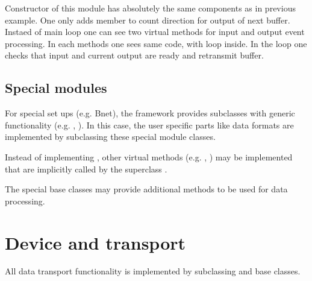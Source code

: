 Constructor of this module has absolutely the same components as in previous example.
One only adds  member to count direction for output of next buffer. 
Instaed of main loop one can see two virtual methods for input and output event
processing. In each methods one sees same code, with  loop inside.
In the loop one checks that input and current output are ready and retransmit buffer.
 
    
   

\subsection{Special modules}
For special set ups (e.g. Bnet), the framework provides 
    subclasses with generic functionality 
   (e.g. , ). 
   In this case, the user specific parts like data formats are 
   implemented by subclassing these special module classes.

   
\begin{compactenum}

\item  Instead of implementing , other virtual 
      methods (e.g. , ) may be 
      implemented that are implicitly called by the superclass .
\item  The special base classes may provide additional 
      methods to be used for data processing.    
\end{compactenum}

\section{Device and transport}
\label{prog_plugin_device}
All data transport functionality is implemented by 
   subclassing   and  base classes.
       
